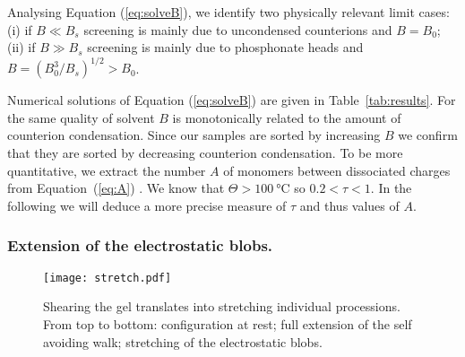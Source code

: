 \documentclass[twoside,twocolumn,9pt]{article}
\begin{document}
Analysing Equation (\ref{eq:solveB}), we identify two physically relevant limit cases: (i) if $B \ll B_s$ screening is mainly due to uncondensed counterions and $B = B_0$; (ii) if $B \gg B_s$ screening is mainly due to phosphonate heads and $B = \left(B_0^3/B_s\right)^{1/2} > B_0$.

Numerical solutions of Equation (\ref{eq:solveB}) are given in Table~\ref{tab:results}. For the same quality of solvent $B$ is monotonically related to the amount of counterion condensation. Since our samples are sorted by increasing $B$ we confirm that they are sorted by decreasing counterion condensation. To be more quantitative, we extract the number $A$ of monomers between dissociated charges from Equation~(\ref{eq:A})%
.
%
We know that $\Theta>\SI{100}{\celsius}$ so $0.2<\tau<1$. In the following we will deduce a more precise measure of $\tau$ and thus values of $A$.


%

\subsubsection{Extension of the electrostatic blobs.}
\begin{figure}
\centering\texttt{[image: stretch.pdf]}
\caption{Shearing the gel translates into stretching individual processions. From top to bottom: configuration at rest; full extension of the self avoiding walk; stretching of the electrostatic blobs.}
\label{fig:stretch}
\end{figure}
\end{document}
